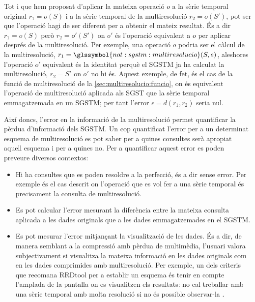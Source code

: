 Tot i que hem proposat d'aplicar la mateixa operació $o$ a la
sèrie temporal original $r_1=o(S)$ i a la sèrie temporal de la
multiresolució $r_2=o(S')$, pot ser que l'operació hagi de ser
diferent per a obtenir el mateix resultat. És a dir $r_1=o(S)$ però
$r_2=o'(S')$ on $o'$ és l'operació equivalent a $o$ per aplicar
després de la multiresolució.  Per exemple, una operació $o$ podria
ser el càlcul de la multiresolució,
$r_1=\glssymbol{not:sgstm:multiresolucio}(S,e)$, aleshores l'operació
$o'$ equivalent és la identitat perquè el \gls{SGSTM} ja ha calculat
la multiresolució, $r_2=S'$ on $o'$ no hi és. Aquest exemple, de fet,
és el cas de la funció de multiresolució de la
\autoref{sec:multiresolucio:funcio}, on és equivalent l'operació de
multiresolució aplicada als \gls{SGST} que la sèrie temporal
emmagatzemada en un \gls{SGSTM}; per tant l'error
$\epsilon =d(r_1,r_2)$ seria nul.





\todo{} 

Així doncs, l'error en la informació de la multiresolució permet
quantificar la pèrdua d'informació dels \gls{SGSTM}. Un cop
quantificat l'error per a un determinat esquema de multiresolució es
pot saber per a quines consultes serà apropiat aquell esquema i per a
quines no. Per a quantificar aquest error es poden preveure diversos
contextos:
\begin{itemize}
\item Hi ha consultes que es poden resoldre a la perfecció, és a dir
  sense error. Per exemple és el cas descrit on l'operació que es vol
  fer a una sèrie temporal és precisament la consulta de
  multiresolució.

\item Es pot calcular l'error mesurant la diferència entre la mateixa
  consulta aplicada a les dades originals que a les dades
  emmagatzemades en el \gls{SGSTM}.

\item Es pot mesurar l'error mitjançant la visualització de les
  dades. És a dir, de manera semblant a la compressió amb pèrdua de
  multimèdia, l'usuari valora subjectivament si visualitza la mateixa
  informació en les dades originals com en les dades comprimides amb
  multiresolució. Per exemple, un dels criteris que recomana RRDtool
  per a establir un esquema és tenir en compte l'amplada de la
  pantalla on es visualitzen els resultats: no cal treballar amb una
  sèrie temporal amb molta resolució si no és possible observar-la
  .

\end{itemize}













